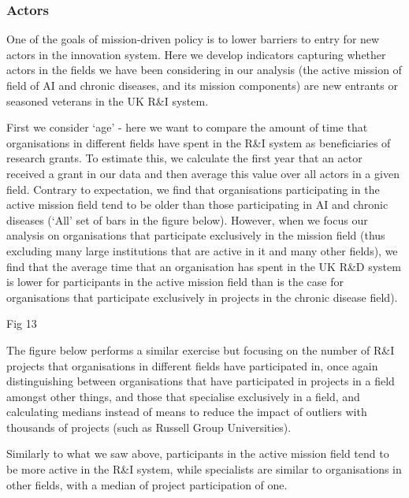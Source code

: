 \documentclass[11pt]{article}
\begin{document}
\subsubsection{Actors}

One of the goals of mission-driven policy is to lower barriers to entry for new actors in the innovation system. Here we develop indicators capturing whether actors in the fields we have been considering in our analysis (the active mission of field of AI and chronic diseases, and its mission components) are new entrants or seasoned veterans in the UK R&I system.

First we consider `age’ - here we want to compare the amount of time that organisations in different fields have spent in the R&I system as beneficiaries of research grants. To estimate this, we calculate the first year that an actor received a grant in our data and then average this value over all actors in a given field. Contrary to expectation, we find that organisations participating in the active mission field tend to be older than those participating in AI and chronic diseases (‘All’ set of bars in the
figure below). However, when we focus our analysis on organisations that participate exclusively in the mission field (thus excluding many large institutions that are active in it and many other fields), we find that the average time that an organisation has spent in the UK R\&D system is lower for participants in the active mission field than is the case for organisations that participate exclusively in projects in the chronic disease field).

Fig 13

The figure below performs a similar exercise but focusing on the number of R&I projects that organisations in different fields have participated in, once again distinguishing between organisations that have participated in projects in a field amongst other things, and those that specialise exclusively in a field, and calculating medians instead of means to reduce the impact of outliers with thousands of projects (such as Russell Group Universities). 

Similarly to what we saw above, participants in the active mission field tend to be more active in the R&I system, while specialists are similar to organisations in other fields, with a median of project participation of one.
\end{document}

